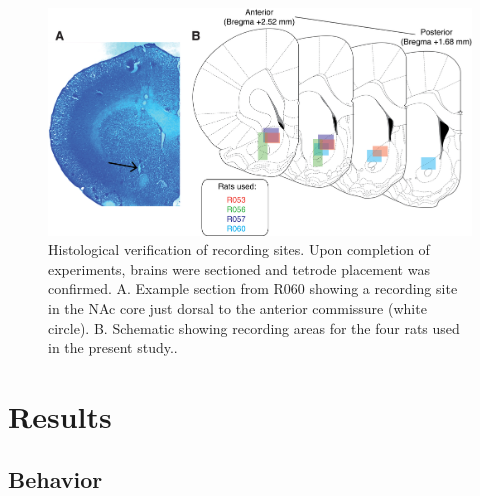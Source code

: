 \documentclass[11pt]{article}
\begin{document}
\begin{figure}[h]
\centering
\includegraphics[width=\textwidth]{Fig 3 - Histology.png}
\caption{Histological verification of recording sites. Upon completion of experiments, brains were sectioned and tetrode placement was confirmed. A. Example section from R060 showing a recording site in the NAc core just dorsal to the anterior commissure (white circle). B. Schematic showing recording areas for the four rats used in the present study..}
\label{fig:histo}
\end{figure}

\section*{Results}

\subsection*{Behavior}
\end{document}
